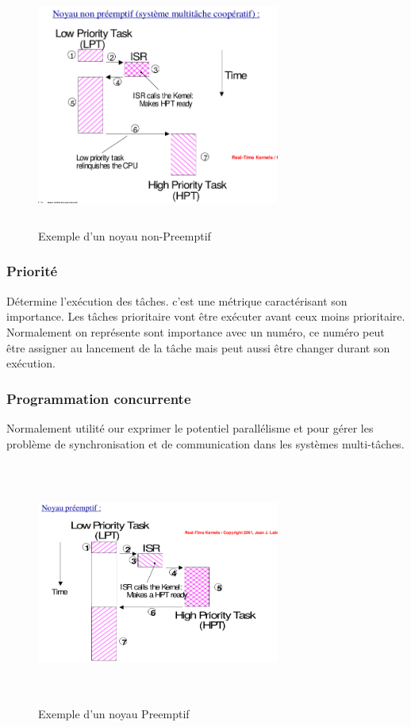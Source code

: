 \documentclass[oneside]{book}
\begin{document}
    
    \begin{figure}[!ht]
    	\centering
    	\includegraphics[width=8cm, height = 8cm, keepaspectratio]{Images/noyau_non_preemptif.png}
    	\caption{Exemple d'un noyau non-Preemptif}
    	\label{fig:NoyauNonPreemptif}
    \end{figure}
    
    \subsubsection{Priorité}
    Détermine l'exécution des tâches. c'est une métrique caractérisant son importance. Les tâches prioritaire vont être exécuter avant ceux moins prioritaire. Normalement on représente sont importance avec un numéro, ce numéro peut être assigner au lancement de la tâche mais peut aussi être changer durant son exécution.\\
    
    
    
    \subsubsection{Programmation concurrente}
    Normalement utilité our exprimer le potentiel parallélisme et pour gérer les problème de synchronisation et de communication dans les systèmes multi-tâches.\\
    
    \begin{figure}[!ht]
    	\centering
    	\includegraphics[width=8cm, height = 8cm, keepaspectratio]{Images/noyau_preemptif.png}
    	\caption{Exemple d'un noyau Preemptif}
    	\label{fig:NoyauPreemptif}
    \end{figure}
\end{document}
